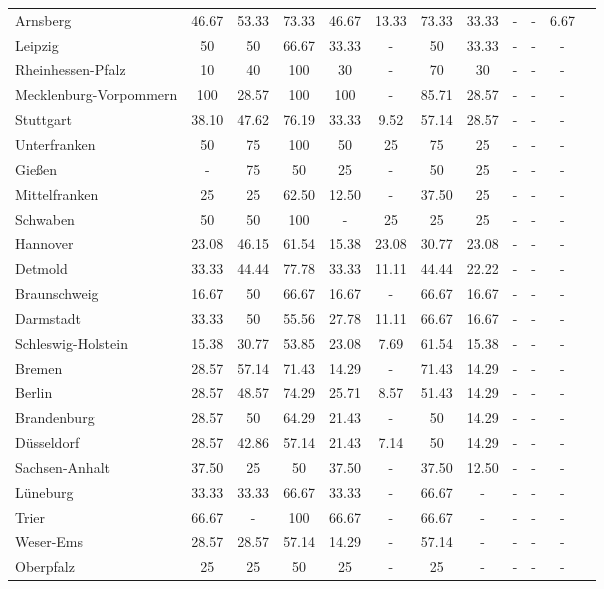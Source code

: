 \begin{table}[H]
\begin{tabularx}{\textwidth}{Xccccccccccc}
            Arnsberg & 46.67 & 53.33 & 73.33 & 46.67 & 13.33 & 73.33 & 33.33 & - & - & 6.67 \\
            Leipzig & 50 & 50 & 66.67 & 33.33 & - & 50 & 33.33 & - & - & - \\
            Rheinhessen-Pfalz & 10 & 40 & 100 & 30 & - & 70 & 30 & - & - & - \\
            Mecklenburg-Vorpommern & 100 & 28.57 & 100 & 100 & - & 85.71 & 28.57 & - & - & - \\
            Stuttgart & 38.10 & 47.62 & 76.19 & 33.33 & 9.52 & 57.14 & 28.57 & - & - & - \\
            Unterfranken & 50 & 75 & 100 & 50 & 25 & 75 & 25 & - & - & - \\
            Gießen & - & 75 & 50 & 25 & - & 50 & 25 & - & - & - \\
            Mittelfranken & 25 & 25 & 62.50 & 12.50 & - & 37.50 & 25 & - & - & - \\
            Schwaben & 50 & 50 & 100 & - & 25 & 25 & 25 & - & - & - \\
            Hannover & 23.08 & 46.15 & 61.54 & 15.38 & 23.08 & 30.77 & 23.08 & - & - & - \\
            Detmold & 33.33 & 44.44 & 77.78 & 33.33 & 11.11 & 44.44 & 22.22 & - & - & - \\
            Braunschweig & 16.67 & 50 & 66.67 & 16.67 & - & 66.67 & 16.67 & - & - & - \\
            Darmstadt & 33.33 & 50 & 55.56 & 27.78 & 11.11 & 66.67 & 16.67 & - & - & - \\
            Schleswig-Holstein & 15.38 & 30.77 & 53.85 & 23.08 & 7.69 & 61.54 & 15.38 & - & - & - \\
            Bremen & 28.57 & 57.14 & 71.43 & 14.29 & - & 71.43 & 14.29 & - & - & - \\
            Berlin & 28.57 & 48.57 & 74.29 & 25.71 & 8.57 & 51.43 & 14.29 & - & - & - \\
            Brandenburg & 28.57 & 50 & 64.29 & 21.43 & - & 50 & 14.29 & - & - & - \\
            Düsseldorf & 28.57 & 42.86 & 57.14 & 21.43 & 7.14 & 50 & 14.29 & - & - & - \\
            Sachsen-Anhalt & 37.50 & 25 & 50 & 37.50 & - & 37.50 & 12.50 & - & - & - \\
            Lüneburg & 33.33 & 33.33 & 66.67 & 33.33 & - & 66.67 & - & - & - & - \\
            Trier & 66.67 & - & 100 & 66.67 & - & 66.67 & - & - & - & - \\
            Weser-Ems & 28.57 & 28.57 & 57.14 & 14.29 & - & 57.14 & - & - & - & - \\
            Oberpfalz & 25 & 25 & 50 & 25 & - & 25 & - & - & - & - \\
        \bottomrule
    \end{tabularx}
\end{table}
    